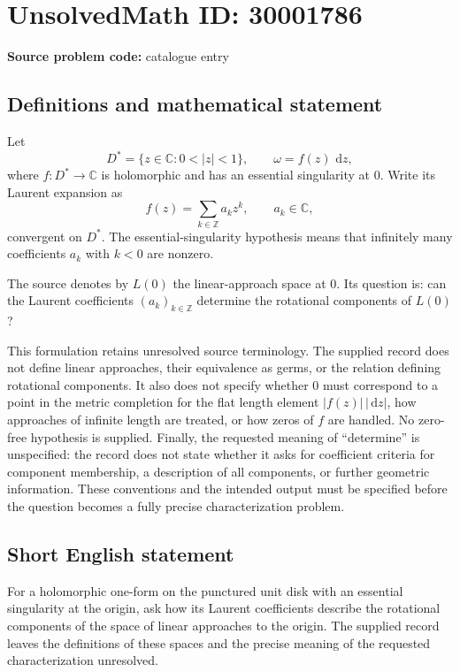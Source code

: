 \documentclass[11pt]{article}
\newcommand{\Z}{\mathbb{Z}}
\newcommand{\C}{\mathbb{C}}
\newcommand{\dd}{\,\mathrm{d}}
\begin{document}
\section*{UnsolvedMath ID: 30001786}
\textbf{Source problem code:} catalogue entry
\subsection{Definitions and mathematical statement}
Let
\[
D^*=\{z\in\C:0<|z|<1\},\qquad \omega=f(z)\,\dd z,
\]
where \(f:D^*\to\C\) is holomorphic and has an essential singularity at \(0\). Write its Laurent expansion as
\[
f(z)=\sum_{k\in\Z}a_kz^k,\qquad a_k\in\C,
\]
convergent on \(D^*\). The essential-singularity hypothesis means that infinitely many coefficients \(a_k\) with \(k<0\) are nonzero.

The source denotes by \(L(0)\) the linear-approach space at \(0\). Its question is: can the Laurent coefficients \((a_k)_{k\in\Z}\) determine the rotational components of \(L(0)\)?

This formulation retains unresolved source terminology. The supplied record does not define linear approaches, their equivalence as germs, or the relation defining rotational components. It also does not specify whether \(0\) must correspond to a point in the metric completion for the flat length element \(|f(z)|\,|\dd z|\), how approaches of infinite length are treated, or how zeros of \(f\) are handled. No zero-free hypothesis is supplied. Finally, the requested meaning of ``determine'' is unspecified: the record does not state whether it asks for coefficient criteria for component membership, a description of all components, or further geometric information. These conventions and the intended output must be specified before the question becomes a fully precise characterization problem.
\subsection{Short English statement}
For a holomorphic one-form on the punctured unit disk with an essential singularity at the origin, ask how its Laurent coefficients describe the rotational components of the space of linear approaches to the origin. The supplied record leaves the definitions of these spaces and the precise meaning of the requested characterization unresolved.
\end{document}

